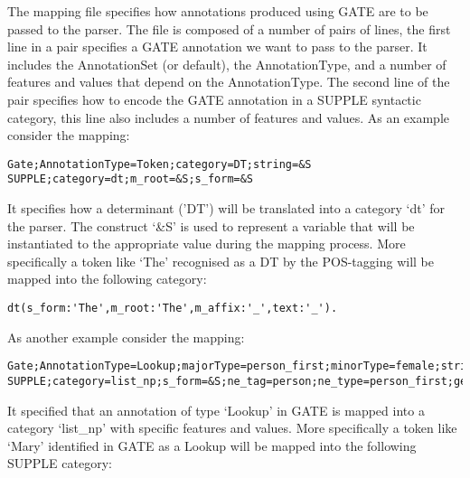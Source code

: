 
The mapping file specifies how annotations produced using GATE are to be passed
to the parser. The file is composed of a number of pairs of lines, the first
line in a pair specifies a GATE annotation we want to pass to the parser. It
includes the AnnotationSet (or default), the AnnotationType, and a number of
features and values that depend on the AnnotationType. The second line of the
pair specifies how to encode the GATE annotation in a SUPPLE syntactic
category, this line also includes a number of features and values. As an example
consider the mapping:

\begin{small}\begin{verbatim}
Gate;AnnotationType=Token;category=DT;string=&S
SUPPLE;category=dt;m_root=&S;s_form=&S
\end{verbatim}\end{small}


It specifies how a determinant ('DT') will be translated into a category `dt'
for the parser. The construct `\&S' is used to represent a variable that will be
instantiated to the appropriate value during the mapping process. More
specifically a token like `The' recognised as a DT by the POS-tagging will be
mapped into the following category:

\begin{small}\begin{verbatim}
dt(s_form:'The',m_root:'The',m_affix:'_',text:'_').
\end{verbatim}\end{small}


As another example consider the mapping:

\begin{small}\begin{verbatim}
Gate;AnnotationType=Lookup;majorType=person_first;minorType=female;string=&S
SUPPLE;category=list_np;s_form=&S;ne_tag=person;ne_type=person_first;gender=female
\end{verbatim}\end{small}


It specified that an annotation of type `Lookup' in GATE is mapped into a
category `list\_np' with specific features and values. More specifically a token
like `Mary' identified in GATE as a Lookup will be mapped into the following
SUPPLE category:

